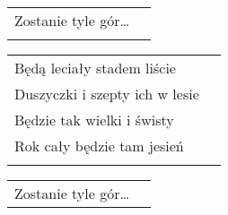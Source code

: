 \documentclass[a5paper]{article}
\begin{document}
\noindent
\begin{tabular}{@{}p{4.50cm}p{3cm}@{}}
Zostanie tyle gór… \\ \\
\end{tabular}

\noindent
\begin{tabular}{@{}p{5.50cm}p{3cm}@{}}
Będą leciały stadem liście \\
Duszyczki i szepty ich w lesie \\
Będzie tak wielki i świsty \\
Rok cały będzie tam jesień \\ \\
\end{tabular}

\noindent
\begin{tabular}{@{}p{4.50cm}p{3cm}@{}}
Zostanie tyle gór…
\end{tabular}
\end{document}
